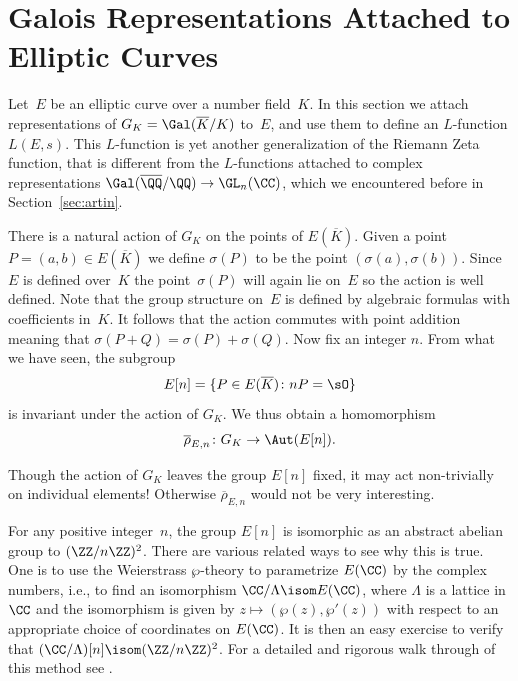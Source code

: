 
\section[Galois Representations]{Galois Representations Attached to Elliptic Curves}

Let~$E$ be an elliptic curve over a number field~$K$.
In this section we attach representations of
$G_K = \Gal(\overline{K}/K)$ to~$E$, and use them to define an $L$-function
$L(E,s)$.   This $L$-function is yet another generalization of the
Riemann Zeta function, that is different from the $L$-functions
attached to complex representations $\Gal(\overline{\QQ}/\QQ)\to \GL_n(\CC)$,
which we encountered before in Section~\ref{sec:artin}.

There is a natural action of $G_K$ on the points of $E(\overline{K})$.
Given a point $P=(a,b)\in E(\overline{K})$ we define $\sigma(P)$ to be
the point $(\sigma(a),\sigma(b))$. Since~$E$ is defined over~$K$ the
point~$\sigma(P)$ will again lie on~$E$ so the action is well
defined. Note that the group structure on~$E$ is defined by
algebraic formulas with coefficients in~$K$. It follows that the
action commutes with point addition meaning that
$\sigma(P+Q) = \sigma(P)+\sigma(Q)$. Now fix an integer $n$.
From what we have seen, the subgroup
\[
  E[n] = \{P \in E(\overline{K}) \colon nP = \sO\}
\]
is invariant under the action of $G_K$.
We thus obtain a homomorphism
\[
  \overline{\rho}_{E,n} \colon G_K \to \Aut(E[n]).
\]

\begin{warning}
  Though the action of $G_K$ leaves the group $E[n]$ fixed,
  it may act non-trivially on individual elements! Otherwise
  $\overline{\rho}_{E,n}$ would not be very interesting.
\end{warning}

For any positive integer~$n$, the group $E[n]$ is isomorphic as an
abstract abelian group to $(\ZZ/n\ZZ)^2$.  There are various
related ways to see why this is true. One is to use the Weierstrass
$\wp$-theory to parametrize $E(\CC)$ by the complex numbers, i.e.,
to find an isomorphism $\CC/\Lambda \isom E(\CC)$, where $\Lambda$ is a
lattice in $\CC$ and the isomorphism is given by $z\mapsto
(\wp(z),\wp'(z))$ with respect to an appropriate choice of coordinates
on $E(\CC)$.  It is then an easy exercise to verify that
$(\CC/\Lambda)[n]\isom (\ZZ/n\ZZ)^2$.
For a detailed and rigorous walk through of this method see
\cite[Ch.~1.4]{diamond-shurman}.

